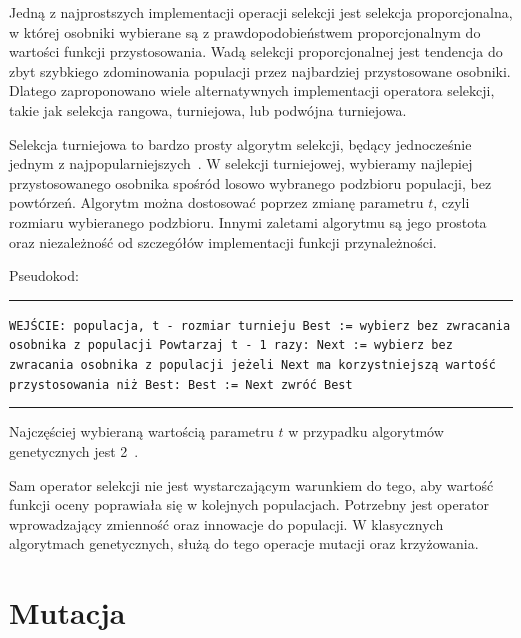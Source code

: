 \documentclass{xmgr}
\begin{document}
Jedną z najprostszych implementacji operacji selekcji jest selekcja proporcjonalna, w której osobniki wybierane są z prawdopodobieństwem proporcjonalnym do wartości funkcji przystosowania. Wadą selekcji proporcjonalnej jest tendencja do zbyt szybkiego zdominowania populacji przez najbardziej przystosowane osobniki. Dlatego zaproponowano wiele alternatywnych implementacji operatora selekcji, takie jak selekcja rangowa, turniejowa, lub podwójna turniejowa.

Selekcja turniejowa to bardzo prosty algorytm selekcji, będący jednocześnie jednym z najpopularniejszych~\cite{Luke2009Metaheuristics}. W selekcji turniejowej, wybieramy najlepiej przystosowanego osobnika spośród losowo wybranego podzbioru populacji, bez powtórzeń. Algorytm można dostosować poprzez zmianę parametru $t$, czyli rozmiaru wybieranego podzbioru. Innymi zaletami algorytmu są jego prostota oraz niezależność od szczegółów implementacji funkcji przynależności.

Pseudokod:

\noindent
\rule{380pt}{0.5pt}\newline
\texttt{WEJŚCIE: populacja, t - rozmiar turnieju\newline
Best := wybierz bez zwracania osobnika z populacji\newline
Powtarzaj t - 1 razy:\newline
\indent Next := wybierz bez zwracania osobnika z populacji\newline
\indent jeżeli Next ma korzystniejszą wartość przystosowania niż Best:\newline
\indent\indent Best := Next\newline
zwróć Best\newline
}
\rule{380pt}{0.5pt}\newline

Najczęściej wybieraną wartością parametru $t$ w przypadku algorytmów genetycznych jest 2~\cite{Luke2009Metaheuristics}.

Sam operator selekcji nie jest wystarczającym warunkiem do tego, aby wartość funkcji oceny poprawiała się w kolejnych populacjach. Potrzebny jest operator wprowadzający zmienność oraz innowacje do populacji. W klasycznych algorytmach genetycznych, służą do tego operacje mutacji oraz krzyżowania.

\section{Mutacja}
\end{document}
